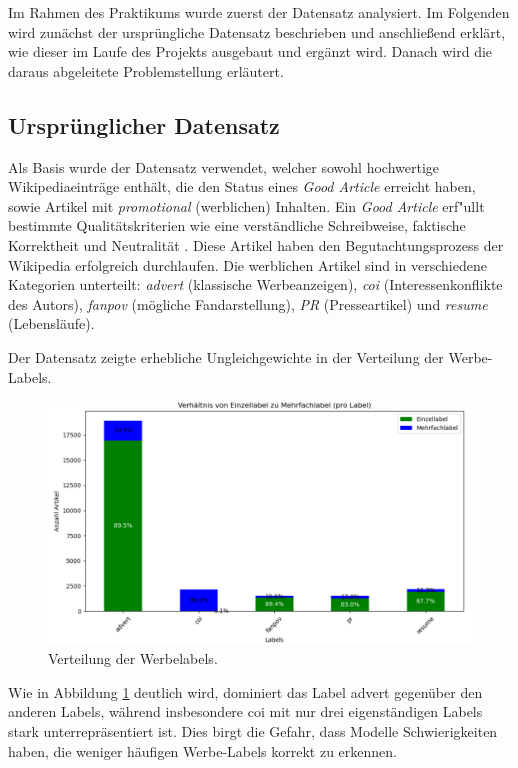 Im Rahmen des Praktikums wurde zuerst der Datensatz analysiert. Im Folgenden wird zunächst der ursprüngliche Datensatz beschrieben und anschließend erklärt, wie dieser im Laufe des Projekts ausgebaut und ergänzt wird. Danach wird die daraus abgeleitete Problemstellung erläutert.

\subsection{Ursprünglicher Datensatz}
\label{UrsprunglicherDatensatz}
Als Basis wurde der Datensatz \cite{Urbanbricks2020} verwendet, welcher sowohl hochwertige Wikipediaeinträge enthält, die den Status eines \emph{Good Article} erreicht haben, sowie Artikel mit \textit{promotional} (werblichen) Inhalten. Ein \emph{Good Article} erf"ullt bestimmte Qualitätskriterien wie eine verständliche Schreibweise, faktische Korrektheit und Neutralität \cite{WikiGA}. Diese Artikel haben den Begutachtungsprozess der Wikipedia erfolgreich durchlaufen. Die werblichen Artikel sind in verschiedene Kategorien unterteilt: \emph{advert} (klassische Werbeanzeigen), \emph{coi} (Interessenkonflikte des Autors), \emph{fanpov} (mögliche Fandarstellung), \emph{PR} (Presseartikel) und \emph{resume} (Lebensläufe).

Der Datensatz zeigte erhebliche Ungleichgewichte in der Verteilung der Werbe-Labels.

\begin{figure}[H]
    \centering
    \includegraphics[width=0.7\linewidth]{figures/labelverteilung.png}
    \caption{Verteilung der Werbelabels.}
    \label{fig:labelverteilung}
\end{figure}

Wie in Abbildung \ref{fig:labelverteilung} deutlich wird, dominiert das Label advert gegenüber den anderen Labels, während insbesondere coi mit nur drei eigenständigen Labels stark unterrepräsentiert ist. Dies birgt die Gefahr, dass Modelle Schwierigkeiten haben, die weniger häufigen Werbe-Labels korrekt zu erkennen.
